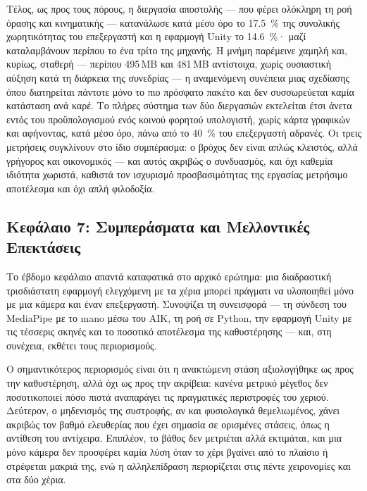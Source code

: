 Τέλος, ως προς τους πόρους, η διεργασία αποστολής --- που φέρει ολόκληρη τη
ροή όρασης και κινηματικής --- κατανάλωσε κατά μέσο όρο το \SI{17.5}{\percent}
της συνολικής χωρητικότητας του επεξεργαστή και η εφαρμογή Unity το
\SI{14.6}{\percent}· μαζί καταλαμβάνουν περίπου το ένα τρίτο της μηχανής. Η
μνήμη παρέμεινε χαμηλή και, κυρίως, σταθερή --- περίπου \num{495}\,MB και
\num{481}\,MB αντίστοιχα, χωρίς ουσιαστική αύξηση κατά τη διάρκεια της
συνεδρίας --- η αναμενόμενη συνέπεια μιας σχεδίασης όπου διατηρείται πάντοτε
μόνο το πιο πρόσφατο πακέτο και δεν συσσωρεύεται καμία κατάσταση ανά καρέ. Το
πλήρες σύστημα των δύο διεργασιών εκτελείται έτσι άνετα εντός του
προϋπολογισμού ενός κοινού φορητού υπολογιστή, χωρίς κάρτα γραφικών και
αφήνοντας, κατά μέσο όρο, πάνω από το \SI{40}{\percent} του επεξεργαστή
αδρανές. Οι τρεις μετρήσεις συγκλίνουν στο ίδιο συμπέρασμα: ο βρόχος δεν είναι
απλώς κλειστός, αλλά γρήγορος και οικονομικός --- και αυτός ακριβώς ο
συνδυασμός, και όχι καθεμία ιδιότητα χωριστά, καθιστά τον ισχυρισμό
προσβασιμότητας της εργασίας μετρήσιμο αποτέλεσμα και όχι απλή φιλοδοξία.



\subsection*{Κεφάλαιο 7: Συμπεράσματα και Μελλοντικές Επεκτάσεις}

Το έβδομο κεφάλαιο απαντά καταφατικά στο αρχικό ερώτημα: μια διαδραστική
τρισδιάστατη εφαρμογή ελεγχόμενη με τα χέρια μπορεί πράγματι να υλοποιηθεί μόνο
με μια κάμερα και έναν επεξεργαστή. Συνοψίζει τη συνεισφορά --- τη σύνδεση του
MediaPipe με το \acrshort{mano} μέσω του AIK, τη ροή σε Python, την εφαρμογή
Unity με τις τέσσερις σκηνές και το ποσοτικό αποτέλεσμα της καθυστέρησης ---
και, στη συνέχεια, εκθέτει τους περιορισμούς.

Ο σημαντικότερος περιορισμός είναι ότι η ανακτώμενη στάση αξιολογήθηκε ως προς
την καθυστέρηση, αλλά όχι ως προς την ακρίβεια: κανένα μετρικό μέγεθος δεν
ποσοτικοποιεί πόσο πιστά αναπαράγει τις πραγματικές περιστροφές του χεριού.
Δεύτερον, ο μηδενισμός της συστροφής, αν και φυσιολογικά θεμελιωμένος, χάνει
ακριβώς τον βαθμό ελευθερίας που έχει σημασία σε ορισμένες στάσεις, όπως η
αντίθεση του αντίχειρα. Επιπλέον, το βάθος δεν μετριέται αλλά εκτιμάται, και
μια μόνο κάμερα δεν προσφέρει καμία λύση όταν το χέρι βγαίνει από το πλαίσιο ή
στρέφεται μακριά της, ενώ η αλληλεπίδραση περιορίζεται στις πέντε χειρονομίες
και στα δύο χέρια.

